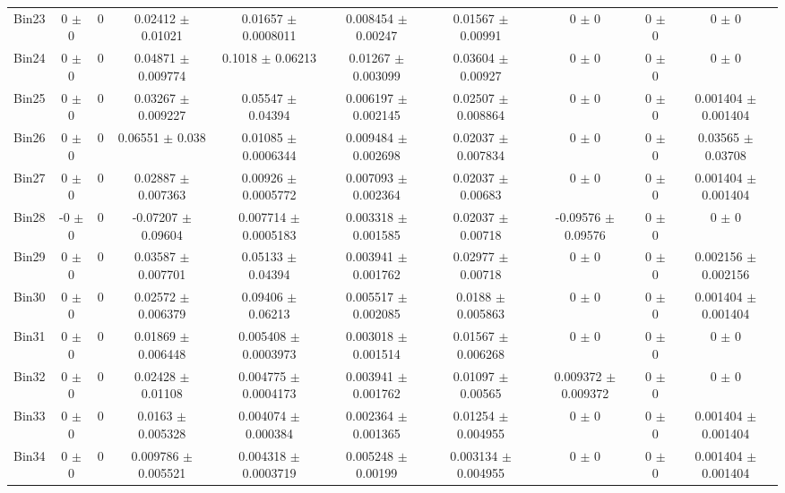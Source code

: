 \begin{tabular}{@{\extracolsep{4pt}}lccccccccc@{}}
     Bin23 & 0 $\pm$ 0 & 0 & 0.02412 $\pm$ 0.01021 & 0.01657 $\pm$ 0.0008011 & 0.008454 $\pm$ 0.00247 & 0.01567 $\pm$ 0.00991 & 0 $\pm$ 0 & 0 $\pm$ 0 & 0 $\pm$ 0 \\ 
     Bin24 & 0 $\pm$ 0 & 0 & 0.04871 $\pm$ 0.009774 & 0.1018 $\pm$ 0.06213 & 0.01267 $\pm$ 0.003099 & 0.03604 $\pm$ 0.00927 & 0 $\pm$ 0 & 0 $\pm$ 0 & 0 $\pm$ 0 \\ 
     Bin25 & 0 $\pm$ 0 & 0 & 0.03267 $\pm$ 0.009227 & 0.05547 $\pm$ 0.04394 & 0.006197 $\pm$ 0.002145 & 0.02507 $\pm$ 0.008864 & 0 $\pm$ 0 & 0 $\pm$ 0 & 0.001404 $\pm$ 0.001404 \\ 
     Bin26 & 0 $\pm$ 0 & 0 & 0.06551 $\pm$ 0.038 & 0.01085 $\pm$ 0.0006344 & 0.009484 $\pm$ 0.002698 & 0.02037 $\pm$ 0.007834 & 0 $\pm$ 0 & 0 $\pm$ 0 & 0.03565 $\pm$ 0.03708 \\ 
     Bin27 & 0 $\pm$ 0 & 0 & 0.02887 $\pm$ 0.007363 & 0.00926 $\pm$ 0.0005772 & 0.007093 $\pm$ 0.002364 & 0.02037 $\pm$ 0.00683 & 0 $\pm$ 0 & 0 $\pm$ 0 & 0.001404 $\pm$ 0.001404 \\ 
     Bin28 & -0 $\pm$ 0 & 0 & -0.07207 $\pm$ 0.09604 & 0.007714 $\pm$ 0.0005183 & 0.003318 $\pm$ 0.001585 & 0.02037 $\pm$ 0.00718 & -0.09576 $\pm$ 0.09576 & 0 $\pm$ 0 & 0 $\pm$ 0 \\ 
     Bin29 & 0 $\pm$ 0 & 0 & 0.03587 $\pm$ 0.007701 & 0.05133 $\pm$ 0.04394 & 0.003941 $\pm$ 0.001762 & 0.02977 $\pm$ 0.00718 & 0 $\pm$ 0 & 0 $\pm$ 0 & 0.002156 $\pm$ 0.002156 \\ 
     Bin30 & 0 $\pm$ 0 & 0 & 0.02572 $\pm$ 0.006379 & 0.09406 $\pm$ 0.06213 & 0.005517 $\pm$ 0.002085 & 0.0188 $\pm$ 0.005863 & 0 $\pm$ 0 & 0 $\pm$ 0 & 0.001404 $\pm$ 0.001404 \\ 
     Bin31 & 0 $\pm$ 0 & 0 & 0.01869 $\pm$ 0.006448 & 0.005408 $\pm$ 0.0003973 & 0.003018 $\pm$ 0.001514 & 0.01567 $\pm$ 0.006268 & 0 $\pm$ 0 & 0 $\pm$ 0 & 0 $\pm$ 0 \\ 
     Bin32 & 0 $\pm$ 0 & 0 & 0.02428 $\pm$ 0.01108 & 0.004775 $\pm$ 0.0004173 & 0.003941 $\pm$ 0.001762 & 0.01097 $\pm$ 0.00565 & 0.009372 $\pm$ 0.009372 & 0 $\pm$ 0 & 0 $\pm$ 0 \\ 
     Bin33 & 0 $\pm$ 0 & 0 & 0.0163 $\pm$ 0.005328 & 0.004074 $\pm$ 0.000384 & 0.002364 $\pm$ 0.001365 & 0.01254 $\pm$ 0.004955 & 0 $\pm$ 0 & 0 $\pm$ 0 & 0.001404 $\pm$ 0.001404 \\ 
     Bin34 & 0 $\pm$ 0 & 0 & 0.009786 $\pm$ 0.005521 & 0.004318 $\pm$ 0.0003719 & 0.005248 $\pm$ 0.00199 & 0.003134 $\pm$ 0.004955 & 0 $\pm$ 0 & 0 $\pm$ 0 & 0.001404 $\pm$ 0.001404 \\ 

\end{tabular}
